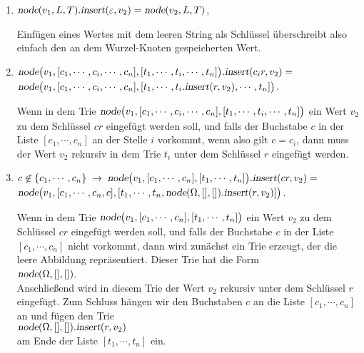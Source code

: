 \begin{enumerate}
\item $\textsl{node}(v_1,L,T).\textsl{insert}(\varepsilon, v_2) = \textsl{node}(v_2,L,T)$,

      Einf\"ugen eines Wertes mit dem leeren String als Schl\"ussel \"uberschreibt also einfach
      den an dem Wurzel-Knoten gespeicherten Wert. 
\item $\textsl{node}\bigl(v_1,[c_1,\cdots,c_i,\cdots,c_n], [t_1,\cdots,t_i,\cdots,t_n]\bigr).\textsl{insert}(c_ir,v_2) =$ \\[0.2cm]
      \hspace*{1.3cm}  
      $\textsl{node}\bigl(v_1,[c_1,\cdots,c_i,\cdots,c_n], [t_1,\cdots,t_i.\textsl{insert}(r,v_2),\cdots,t_n]\bigr)$.

      Wenn in dem Trie $\textsl{node}\bigl(v_1,[c_1,\cdots,c_i,\cdots,c_n], [t_1,\cdots,t_i,\cdots,t_n]\bigr)$ ein Wert
      $v_2$ zu dem Schl\"ussel $cr$ eingef\"ugt werden soll, und falls der Buchstabe $c$ in der Liste $[c_1,\cdots,c_n]$
      an der Stelle $i$ vorkommt, wenn also gilt $c= c_i$, dann muss der Wert $v_2$
      rekursiv in dem Trie $t_i$ unter dem Schl\"ussel 
      $r$ eingef\"ugt werden.

\item $c \not\in\{c_1,\cdots,c_n\} \;\rightarrow\;\textsl{node}\bigl(v_1,[c_1,\cdots,c_n], [t_1,\cdots,t_n]\bigr).\textsl{insert}(cr,v_2) =$ \\[0.2cm]
      \hspace*{1.3cm}  
      $\textsl{node}\bigl(v_1,[c_1,\cdots,c_n,c], [t_1,\cdots,t_n,\textsl{node}(\Omega,[],[]).\textsl{insert}(r,v_2)]\bigr)$.
      
      Wenn in dem Trie $\textsl{node}\bigl(v_1,[c_1,\cdots,c_n], [t_1,\cdots,t_n]\bigr)$
      ein Wert $v_2$ zu dem Schl\"ussel $cr$ eingef\"ugt werden soll, und falls der Buchstabe
      $c$ in der Liste $[c_1,\cdots,c_n]$ nicht vorkommt, dann wird zun\"achst ein Trie
      erzeugt, der die leere Abbildung repr\"asentiert.  Dieser Trie hat die Form \\[0.2cm]
      \hspace*{1.3cm} $\textsl{node}(\Omega, [], [])$. \\[0.2cm]
      Anschlie{\ss}end wird in diesem Trie der Wert $v_2$ rekursiv unter dem Schl\"ussel $r$
      eingef\"ugt. Zum Schluss h\"angen wir den Buchstaben $c$ an die Liste $[c_1,\cdots,c_n]$
      an und f\"ugen den Trie  \\[0.2cm] 
      \hspace*{1.3cm} $\textsl{node}(\Omega, [], []).\textsl{insert}(r,v_2)$ \\[0.2cm]
      am Ende der Liste $[t_1,\cdots,t_n]$ ein.
\end{enumerate}

